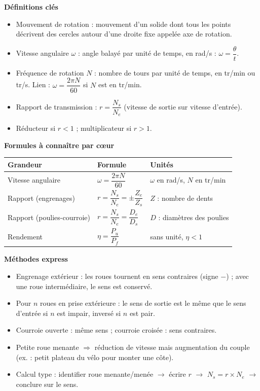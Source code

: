 \documentclass[11pt]{article}
\newcommand{\cle}[1]{{\popxbold\color{popdark}#1}}
\begin{document}
\begin{aretenir}[L'essentiel de la le\c{c}on]
\textbf{D\'efinitions cl\'es}
\begin{itemize}
  \item \cle{Mouvement de rotation} : mouvement d'un solide dont tous les points d\'ecrivent des cercles autour d'une droite fixe appel\'ee \cle{axe de rotation}.
  \item \cle{Vitesse angulaire} $\omega$ : angle balay\'e par unit\'e de temps, en rad/s : $\omega = \dfrac{\theta}{t}$.
  \item \cle{Fr\'equence de rotation} $N$ : nombre de tours par unit\'e de temps, en tr/min ou tr/s. Lien : $\omega = \dfrac{2\pi N}{60}$ si $N$ est en tr/min.
  \item \cle{Rapport de transmission} : $r = \dfrac{N_s}{N_e}$ (vitesse de sortie sur vitesse d'entr\'ee).
  \item \cle{R\'educteur} si $r<1$ ; \cle{multiplicateur} si $r>1$.
\end{itemize}

\textbf{Formules \`a conna\^itre par c\oe ur}
\begin{center}
\begin{tabularx}{\linewidth}{|l|X|X|}
\hline
\rowcolor{popblueL} \textbf{Grandeur} & \textbf{Formule} & \textbf{Unit\'es} \\
\hline
Vitesse angulaire & $\omega=\dfrac{2\pi N}{60}$ & $\omega$ en rad/s, $N$ en tr/min \\
\hline
Rapport (engrenages) & $r=\dfrac{N_s}{N_e}=\pm\dfrac{Z_e}{Z_s}$ & $Z$ : nombre de dents \\
\hline
Rapport (poulies-courroie) & $r=\dfrac{N_s}{N_e}=\dfrac{D_e}{D_s}$ & $D$ : diam\`etres des poulies \\
\hline
Rendement & $\eta=\dfrac{P_u}{P_f}$ & sans unit\'e, $\eta<1$ \\
\hline
\end{tabularx}
\end{center}

\textbf{M\'ethodes express}
\begin{itemize}
  \item Engrenage ext\'erieur : les roues tournent en \cle{sens contraires} (signe $-$) ; avec une roue interm\'ediaire, le sens est conserv\'e.
  \item Pour $n$ roues en prise ext\'erieure : le sens de sortie est le m\^eme que le sens d'entr\'ee si $n$ est impair, invers\'e si $n$ est pair.
  \item Courroie ouverte : m\^eme sens ; courroie crois\'ee : sens contraires.
  \item Petite roue menante $\Rightarrow$ r\'eduction de vitesse mais \cle{augmentation du couple} (ex. : petit plateau du v\'elo pour monter une c\^ote).
  \item Calcul type : identifier roue menante/men\'ee $\to$ \'ecrire $r$ $\to$ $N_s = r \times N_e$ $\to$ conclure sur le sens.
\end{itemize}
\end{aretenir}
\end{document}
